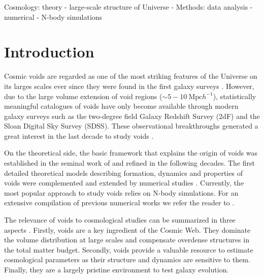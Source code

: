 \documentclass[a4,useAMS,usenatbib,usegraphicx]{mn2e}
\begin{document}
\begin{keywords}
Cosmology: theory - large-scale structure of Universe -
Methods: data analysis - numerical - N-body simulations
\end{keywords}



\section{Introduction}
\label{sec:introduction}

Cosmic voids are regarded as one of the most striking features of the
Universe on its larges scales ever since they were found in the first
galaxy surveys \citep{Chincarini75, Gregory78, Einasto80M, Einasto80N,
  Kirshner81, Zeldovich82,Kirshner87}.  
However, due to the large volume extension of void regions ($\sim
5-10\ \mbox{Mpc}  h^{-1}$), statistically meaningful catalogues of
voids \citep{Pan10,  Sutter12b, Nadathur14} have only become available
through modern galaxy surveys such as the two-degree field Galaxy
Redshift Survey (2dF) \citep{ Colless01, Colless03} and the Sloan
Digital Sky Survey (SDSS)\citep{York00, Abazajian03}.
These observational breakthroughs generated a great interest in the last
decade to study voids \citep{Hoyle04, Croton04, Padilla05, Rojas05,
  Ceccarelli06, Patiri06a, Tikhonov06, Patiri06b,Tikhonov07,
  BendaBeckmann08, Foster09, Ceccarelli13, Paz13, Sutter14a}. 


On the theoretical side, the basic framework that explains
the origin of voids was established in the seminal work of
\citet{Zeldovich70} and refined in the following decades.  
The first detailed theoretical models describing formation, dynamics
and properties of  voids \citep{Hoffman82, Icke84, Bertschinger85,
  Blumenthal92} were  complemented and extended by numerical studies
\citep{Martel90, Regos91, Weygaert93, Dubinski93, Bond96}. 
Currently, the most popular approach to study voids relies on N-body
simulations. For an extensive compilation of previous  
numerical works we refer the reader to \citet{Colberg08}.


The relevance of voids to cosmological studies can be summarized in
three aspects \citep{Platen07}. 
Firstly, voids are a key ingredient of the Cosmic Web. 
They dominate the volume distribution at large scales and
compensate overdense structures in the total matter
budget. 
Secondly, voids provide a valuable resource to estimate  
cosmological parameters as their structure and dynamics are sensitive
to them. 
Finally, they are a largely pristine environment to test galaxy
evolution. 
\end{document}
